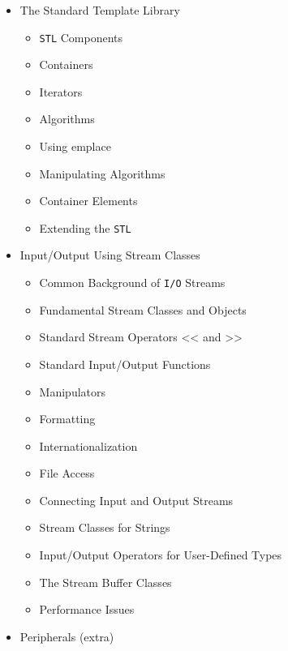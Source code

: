 \documentclass[
]{article}
\providecommand{\tightlist}{%
  \setlength{\itemsep}{0pt}\setlength{\parskip}{0pt}}
\begin{document}
\begin{itemize}
  \begin{itemize}
  \tightlist
  \item
    Understand the two meanings of typename
  \item
    Know how to access names in templatized base classes
  \item
    Parameter-independent code
  \item
    Traits
  \item
    Template metaprogramming
  \end{itemize}
\item
  The Standard Template Library

  \begin{itemize}
  \tightlist
  \item
    \texttt{STL} Components
  \item
    Containers
  \item
    Iterators
  \item
    Algorithms
  \item
    Using emplace
  \item
    Manipulating Algorithms
  \item
    Container Elements
  \item
    Extending the \texttt{STL}
  \end{itemize}
\item
  Input/Output Using Stream Classes

  \begin{itemize}
  \tightlist
  \item
    Common Background of \texttt{I/O} Streams
  \item
    Fundamental Stream Classes and Objects
  \item
    Standard Stream Operators \textless\textless{} and
    \textgreater\textgreater{}
  \item
    Standard Input/Output Functions
  \item
    Manipulators
  \item
    Formatting
  \item
    Internationalization
  \item
    File Access
  \item
    Connecting Input and Output Streams
  \item
    Stream Classes for Strings
  \item
    Input/Output Operators for User-Defined Types
  \item
    The Stream Buffer Classes
  \item
    Performance Issues
  \end{itemize}
\item
  Peripherals (extra)


\end{itemize}
\end{document}
